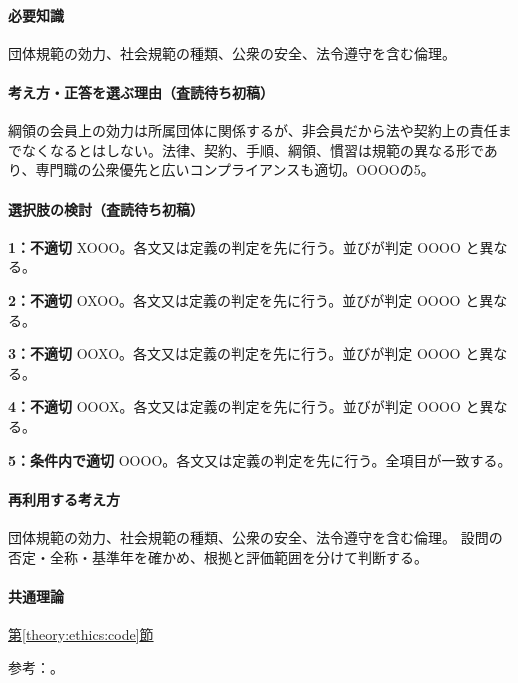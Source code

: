 \paragraph{必要知識} 団体規範の効力、社会規範の種類、公衆の安全、法令遵守を含む倫理。

\paragraph{考え方・正答を選ぶ理由（査読待ち初稿）} 綱領の会員上の効力は所属団体に関係するが、非会員だから法や契約上の責任までなくなるとはしない。法律、契約、手順、綱領、慣習は規範の異なる形であり、専門職の公衆優先と広いコンプライアンスも適切。OOOOの5。

\paragraph{選択肢の検討（査読待ち初稿）}\mbox{}\par

\noindent\textbf{1：不適切} XOOO。各文又は定義の判定を先に行う。並びが判定 OOOO と異なる。\par

\noindent\textbf{2：不適切} OXOO。各文又は定義の判定を先に行う。並びが判定 OOOO と異なる。\par

\noindent\textbf{3：不適切} OOXO。各文又は定義の判定を先に行う。並びが判定 OOOO と異なる。\par

\noindent\textbf{4：不適切} OOOX。各文又は定義の判定を先に行う。並びが判定 OOOO と異なる。\par

\noindent\textbf{5：条件内で適切} OOOO。各文又は定義の判定を先に行う。全項目が一致する。\par

\paragraph{再利用する考え方} 団体規範の効力、社会規範の種類、公衆の安全、法令遵守を含む倫理。 設問の否定・全称・基準年を確かめ、根拠と評価範囲を分けて判断する。

\paragraph{共通理論} \hyperref[theory:ethics:code]{第\ref*{theory:ethics:code}節}

\par 参考：\cite{ipej_ethics2011}。

